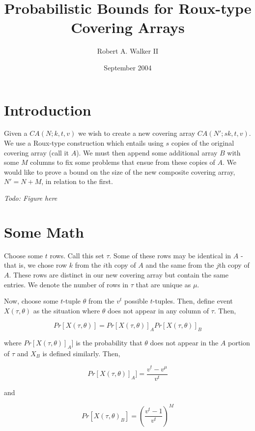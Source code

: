 \documentclass{article}
\title{Probabilistic Bounds for Roux-type Covering Arrays}
\author{Robert A. Walker II}
\date{September 2004}
\begin{document}
\maketitle

\section{Introduction}

Given a $CA(N; k, t, v)$ we wish to create a new covering array $CA(N'; sk, t, v)$.  We use a Roux-type construction
which entails using $s$ copies of the original covering array (call it $A$). We must then append some additional array
$B$ with some $M$ columns to fix some problems that ensue from these copies of $A$.  We would like to prove a bound on
the size of the new composite covering array, $N' = N + M$, in relation to the first.

\emph{Todo: Figure here}

\section{Some Math}

Choose some $t$ rows.  Call this set $\tau$.  Some of these rows may be identical in $A$ - that is, we chose row $k$ from
the $i$th copy of $A$ and the same from the $j$th copy of $A$.  These rows are distinct in our new covering array but
contain the same entries.  We denote the number of rows in $\tau$ that are unique as $\mu$.

Now, choose some $t$-tuple $\theta$ from the $v^t$ possible $t$-tuples.  Then, define event $X(\tau, \theta)$ as the
situation where $\theta$ does not appear in any column of $\tau$.  Then,

\begin{equation}
Pr[X(\tau, \theta)] = Pr[X(\tau, \theta)]_A Pr[X(\tau, \theta)]_B
\end{equation}

where $Pr[X(\tau, \theta)]_A]$ is the probability that $\theta$ does not appear in the $A$ portion of $\tau$ and $X_B$ is
defined similarly.  Then,

\begin{equation}
\label{Pr[X(T,t)_A]}
Pr[X(\tau, \theta)]_A] = \frac{v^t - v^\mu}{v^t}
\end{equation}

and

\begin{equation}
\label{Pr[X(T,t)_B]}
Pr[X(\tau, \theta)_B] = \left( \frac{v^t - 1}{v^t} \right)^M
\end{equation}
\end{document}

